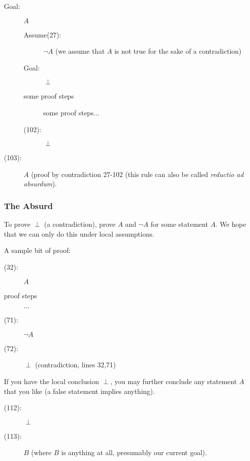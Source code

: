 \documentclass[12pt]{article}
\begin{document}
\begin{description}

\item[Goal:]  $A$

\begin{description}

\item[Assume(27):]  $\neg A$  (we assume that $A$ is not true for the sake of a contradiction)

\item[Goal:]    $\perp$

\item[some proof steps]  some proof steps$\ldots$

\item[(102):]  $\perp$

\end{description}



\item[(103):]  $A$ (proof by contradiction 27-102 (this rule can also be called {\em reductio ad absurdum\/}).

\end{description}

\subsubsection{The Absurd}

To prove $\perp$ (a contradiction), prove $A$ and $\neg A$ for some
statement $A$.  We hope that we can only do this under local
assumptions.

A sample bit of proof:

\begin{description}

\item[(32):]  $A$

\item[proof steps] $\ldots$

\item[(71):]  $\neg A$

\item[(72):]  $\perp$ (contradiction, lines 32,71)

\end{description}

If you have the local conclusion $\perp$, you may further conclude any
statement $A$ that you like (a false statement implies anything).

\begin{description}

\item[(112):]  $\perp$

\item[(113):]  $B$ (where $B$ is anything at all, presumably our current goal).

\end{description}
\end{document}
